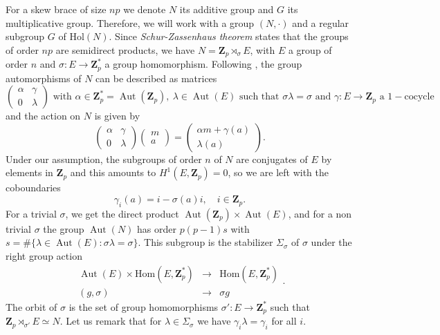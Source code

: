 \documentclass[12pt]{article}
\theoremstyle{definition}
\newcommand{\Z}{\mathbf Z}
\newcommand{\Hol}{\mathrm{Hol}}
\newcommand{\Hom}{\mathrm{Hom}}
\newcommand{\Aut}{\operatorname{Aut}}
\begin{document}
	For a skew brace of size $np$ we denote $N$ its additive group and $G$ its multiplicative group. Therefore, we will work with a group $(N,\cdot)$ and a regular subgroup $G$
    of $\Hol(N)$. Since \textit{Schur-Zassenhaus theorem} states that the groups of order $np$ are semidirect products, we have $N=\Z_p\rtimes_\sigma E$, with $E$
	a group of order $n$ and $\sigma:E\to \Z_p^*$ a group homomorphism. 
	Following \cite{curran}, the group automorphisms of $N$ can be described as matrices
	$$
	\begin{pmatrix}
	\alpha & \gamma\\
	0&\lambda
	\end{pmatrix}
	\mbox{ 
		with }\alpha\in \Z_p^*=\Aut(\Z_p),\ 
	\lambda\in \Aut(E)\mbox{ such that }\sigma\lambda=\sigma
	\mbox{ and }\gamma:E\to\Z_p \mbox{ a }1-\mbox{cocycle}$$
	and the action on $N$ is given by
	$$\begin{pmatrix}
	\alpha & \gamma\\
	0&\lambda
	\end{pmatrix}
	\begin{pmatrix}
	m\\
	a
	\end{pmatrix}=
	\begin{pmatrix}
	\alpha m+\gamma(a)\\
	\lambda(a)
	\end{pmatrix}.
	$$
	Under our assumption, the subgroups of order $n$ of $N$ are  conjugates of $E$ by elements in $\Z_p$ and this
    amounts to $H^1(E,\Z_p)=0$, so we are left with the coboundaries
	$$
	\gamma_i(a)=i-\sigma(a)i,\quad  i\in\Z_p.
	$$
	For a trivial $\sigma$, we get the direct product $\Aut(\Z_p)\times \Aut(E)$, and for a non trivial $\sigma$ the group $\Aut(N)$ has order $p(p-1)s$ with $s=\#\{\lambda\in \Aut(E): \sigma \lambda=\sigma\}$. This subgroup is the stabilizer $\Sigma_{\sigma}$ of $\sigma$ under the right group action
	$$
	\begin{array}{ccl}
	\Aut(E)\times \Hom(E,\Z_p^*)&\longrightarrow &\Hom(E,\Z_p^*)\\
	(g, \sigma) &\longrightarrow & \sigma g
	\end{array}.
	$$
	The orbit of $\sigma$ is the set of group homomorphisms $\sigma':E\to \Z_p^*$ such that $\Z_p\rtimes_{\sigma'}E\simeq N$.  Let us remark that for 
    $\lambda\in \Sigma_{\sigma}$ we have $\gamma_i\lambda=\gamma_i$ for all $i$.
 
	
	
\end{document}
